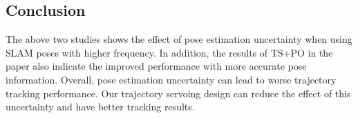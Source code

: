 \subsection{Conclusion}

The above two studies shows the effect of pose estimation uncertainty 
when using SLAM poses with higher frequency.
In addition, the results of TS+PO in the paper also 
indicate the improved performance with more accurate pose information. 
Overall, pose estimation uncertainty can lead to worse trajectory tracking performance. 
Our trajectory servoing design can reduce the effect of this uncertainty 
and have better tracking results.
